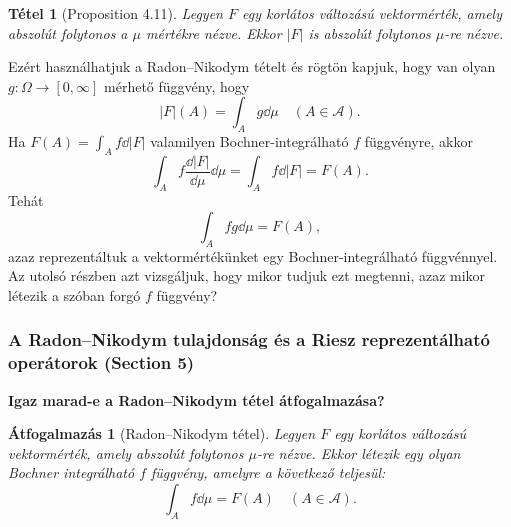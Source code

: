 \documentclass[handout]{beamer} %
\newtheorem{theo}[lem]{Tétel}
\newtheorem{atfog}[lem]{Átfogalmazás}
\begin{document}
\begin{frame}
\justifying
\begin{theo}[Proposition 4.11] Legyen $F$ egy korlátos változású vektormérték, amely abszolút folytonos a $\mu$ mértékre nézve. Ekkor $|F|$ is abszolút folytonos $\mu$-re nézve.
\end{theo}
Ezért használhatjuk a Radon\---Nikodym tételt és rögtön kapjuk, hogy van olyan $g \colon \Omega \to [0,\infty]$ mérhető függvény, hogy
$$|F|(A) = \int_{A} g \dd{\mu} \quad (A \in \mathcal{A}).$$ Ha $F(A) = \int_{A} f \dd{|F|}$ valamilyen Bochner-integrálható $f$ függvényre, akkor
$$\int_{A} f \frac{\dd{|F|}}{\dd{\mu}} \dd{\mu} = \int_{A} f \dd{|F|} = F(A).$$
Tehát 
$$\int_{A} fg \dd{\mu} = F(A),$$
azaz reprezentáltuk a vektormértékünket egy Bochner-integrálható függvénnyel. Az utolsó részben azt vizsgáljuk, hogy mikor tudjuk ezt megtenni, azaz mikor létezik a szóban forgó $f$ függvény?
\end{frame}

\begin{frame}
\frametitle{A Radon\---Nikodym tulajdonság és a Riesz reprezentálható operátorok (Section 5)}
\justifying
\textbf{Igaz marad-e a Radon\---Nikodym tétel átfogalmazása?}
\begin{atfog}[Radon\---Nikodym tétel] Legyen $F$ egy korlátos változású vektormérték, amely abszolút folytonos $\mu$-re nézve. Ekkor létezik egy olyan Bochner integrálható $f$ függvény, amelyre a következő teljesül:
$$\int_{A} f \dd{\mu} = F(A) \quad (A \in \mathcal{A}).$$
\end{atfog}
\end{frame}
\end{document}
